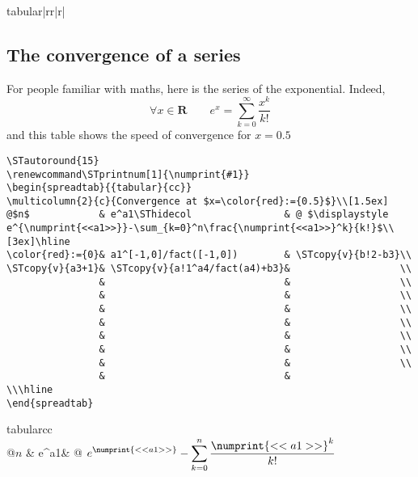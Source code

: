 \documentclass[a4paper,10pt]{article}
\begin{document}
\begin{<table environment>}
\begin{spreadtab}{{tabular}{|rr|r|}}
\subsection{The convergence of a series}
For people familiar with maths, here is the series of the exponential. Indeed,
\[\forall x\in \mathbf{R}\qquad e^x=\sum_{k=0}^\infty\frac{x^k}{k!}\]
and this table shows the speed of convergence for $x=0.5$
\begin{lstlisting}
\STautoround{15}
\renewcommand\STprintnum[1]{\numprint{#1}}
\begin{spreadtab}{{tabular}{cc}}
\multicolumn{2}{c}{Convergence at $x=\color{red}:={0.5}$}\\[1.5ex]
@$n$            & e^a1\SThidecol                & @ $\displaystyle e^{\numprint{<<a1>>}}-\sum_{k=0}^n\frac{\numprint{<<a1>>}^k}{k!}$\\[3ex]\hline
\color{red}:={0}& a1^[-1,0]/fact([-1,0])        & \STcopy{v}{b!2-b3}\\
\STcopy{v}{a3+1}& \STcopy{v}{a!1^a4/fact(a4)+b3}&                   \\
                &                               &                   \\
                &                               &                   \\
                &                               &                   \\
                &                               &                   \\
                &                               &                   \\
                &                               &                   \\
                &                               &                   \\
                &                               &                   \\\hline
\end{spreadtab}
\end{lstlisting}
\begin{center}
\renewcommand\STprintnum[1]{\numprint{#1}}
\begin{spreadtab}{{tabular}{cc}}
\\[1.5ex]
@$n$            & e^a1\SThidecol                & @ $\displaystyle e^{\numprint{<<a1>>}}-\sum_{k=0}^n\frac{\numprint{<<a1>>}^k}{k!}$\\[3ex]\hline

\end{spreadtab}
\end{center}
\end{spreadtab}
\end{<table environment>}
\end{document}
